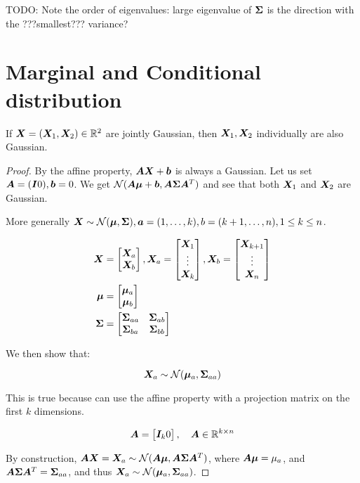 TODO: Note the order of eigenvalues: large eigenvalue of ${\bm{\Sigma}}$ is the direction with the ???smallest??? variance?

\section{Marginal and Conditional distribution}

If ${\bm{X}} = ({\bm{X}}_1, {\bm{X}}_2) \in {\mathbb{R}}^2$ are jointly Gaussian, then ${\bm{X}}_1, {\bm{X}}_2$ individually are also Gaussian. 

\begin{proof}
By the affine property, ${\bm{A}} {\bm{X}} + {\bm{b}}$ is always a Gaussian. Let us set ${\bm{A}} = ({\bm{I}} 0), {\bm{b}} = 0$. We get ${\mathcal{N}}({\bm{A}} {\bm{\mu}} + {\bm{b}}, {\bm{A}} {\bm{\Sigma}} {\bm{A}}^T)$ and see that both ${\bm{X}}_1$ and ${\bm{X}}_2$ are Gaussian.

More generally ${\bm{X}} \sim {\mathcal{N}}({\bm{\mu}}, {\bm{\Sigma}}), {\bm{a}} = (1, \dots, k), b = (k+1, \dots, n), 1 \leq k \leq n$.

\begin{align}
    {\bm{X}} &= \begin{bmatrix} {\bm{X}}_a \\ {\bm{X}}_b \end{bmatrix},
    {\bm{X}}_a = \begin{bmatrix} {\bm{X}}_1 \\ \vdots \\ {\bm{X}}_k \end{bmatrix},
    {\bm{X}}_b = \begin{bmatrix} {\bm{X}}_{k+1} \\ \vdots \\ {\bm{X}}_n \end{bmatrix} \\
    {\bm{\mu}} &= \begin{bmatrix} {\bm{\mu}}_a \\ {\bm{\mu}}_b \end{bmatrix} \\
    {\bm{\Sigma}} &= \begin{bmatrix}
        {\bm{\Sigma}}_{aa} & {\bm{\Sigma}}_{ab} \\
        {\bm{\Sigma}}_{ba} & {\bm{\Sigma}}_{bb}
    \end{bmatrix}
\end{align}

We then show that:

\begin{equation}
{\bm{X}}_a \sim {\mathcal{N}}({\bm{\mu}}_a, {\bm{\Sigma}}_{aa})
\end{equation}

This is true because can use the affine property with a projection matrix on the first $k$ dimensions.

\begin{equation}
    {\bm{A}} = \begin{bmatrix} {\bm{I}}_k 0 \end{bmatrix}, \quad {\bm{A}} \in {\mathbb{R}}^{k \times n}
\end{equation}

By construction, ${\bm{A}} {\bm{X}} = {\bm{X}}_a \sim {\mathcal{N}}({\bm{A}} {\bm{\mu}}, {\bm{A}} {\bm{\Sigma}} {\bm{A}}^T)$, where ${\bm{A}} {\bm{\mu}} = \mu_a$, and ${\bm{A}} {\bm{\Sigma}} {\bm{A}}^T = {\bm{\Sigma}}_{aa}$, and thus ${\bm{X}}_a \sim {\mathcal{N}}({\bm{\mu}}_a, {\bm{\Sigma}}_{aa})$.

\end{proof}